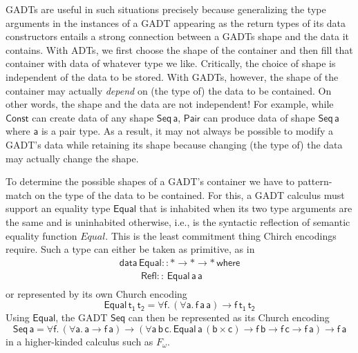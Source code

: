 \documentclass[acmsmall,screen,review,anonymous]{acmart}
\theoremstyle{definition}
\begin{document}
GADTs are useful in such situations precisely because generalizing the
type arguments in the instances of a GADT appearing as the return
types of its data constructors entails a strong connection between a
GADTs shape and the data it contains.  With ADTs, we first choose the
shape of the container and then fill that container with data of
whatever type we like. Critically, the choice of shape is independent
of the data to be stored. With GADTs, however, the shape of the
container may actually {\em depend} on (the type of) the data to be
contained. On other words, the shape and the data are not independent!
For example, while $\mathsf{Const}$ can create data of any shape
$\mathsf{Seq\,a}$, $\mathsf{Pair}$ can produce data of shape
$\mathsf{Seq\,a}$ where $\mathsf{a}$ is a pair type. As a result, it
may not always be possible to modify a GADT's data while retaining its
shape because changing (the type of) the data may actually change the
shape.

To determine the possible shapes of a GADT's container we have to
pattern-match on the type of the data to be contained. For this, a
GADT calculus must support an equality type $\mathsf{Equal}$ that is
inhabited when its two type arguments are the same and is uninhabited
otherwise, i.e., is the syntactic reflection of semantic equality
function $\mathit{Equal}$. {\color{blue} This is the least commitment
  thing Chirch encodings require.} Such a type can either be taken as
primitive, as in
\[\begin{array}{l}
\mathsf{data\, Equal :: * \to * \to *\,where}\\
\mathsf{\;\;\;\;\;\;\;\;Refl ::\, Equal\,a\,a}\\
\end{array}\]
\noindent
or
represented by its own Church encoding
\[\mathsf{Equal\,t_1\,t_2} = \mathsf{\forall f.\, (\forall a.\,
  f\,a\,a) \to f\,t_1\,t_2}\] Using $\mathsf{Equal}$, the GADT
$\mathsf{Seq}$ can then be represented as its Church encoding
\[\mathsf{Seq\,a} = \mathsf{\forall f.\, (\forall a.\,a \to f\, a)
  \to (\forall a\,b\,c.\,Equal\,a\,(b\times c) \to f\,b \to f\,c \to
  f\,a) \to f\,a}\]
in a higher-kinded calculus such as $F_\omega$.
\end{document}
